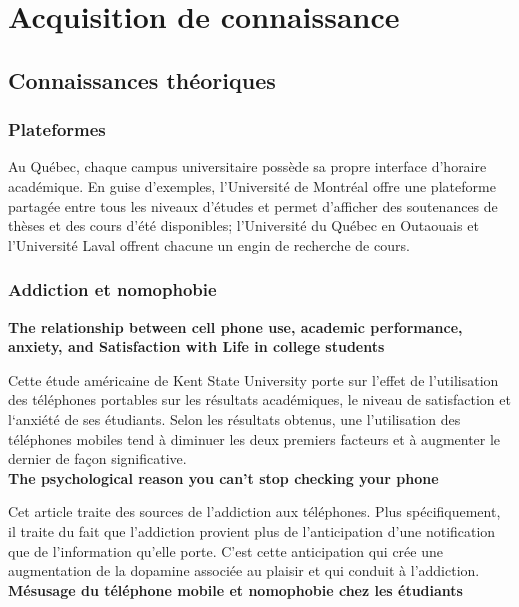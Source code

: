 \section{Acquisition de connaissance}

	\subsection{Connaissances théoriques}
		\subsubsection{Plateformes}
		Au Québec, chaque campus universitaire possède sa propre interface d'horaire académique. En guise d'exemples, l'Université de Montréal offre une plateforme partagée entre tous les niveaux d'études et permet d'afficher des soutenances de thèses et des cours d'été disponibles; l'Université du Québec en Outaouais et l'Université Laval offrent chacune un engin de recherche de cours.
		
		\subsubsection{Addiction et nomophobie}
		
		{\bfseries \cite{relationship} The relationship between cell phone use, academic performance, anxiety, and Satisfaction with Life in college students}	
		
		Cette étude américaine de Kent State University porte sur l'effet de l'utilisation des téléphones portables sur les résultats académiques, le niveau de satisfaction et l‘anxiété de ses étudiants. Selon les résultats obtenus, une l'utilisation des téléphones mobiles tend à diminuer les deux premiers facteurs et à augmenter le dernier de façon significative. \\
		
		{\bfseries \cite{cannotStop} The psychological reason you can't stop checking your phone}
		
		Cet article traite des sources de l'addiction aux téléphones. Plus spécifiquement, il traite du fait que l'addiction provient plus de l'anticipation d'une notification que de l'information qu'elle porte. C'est cette anticipation qui crée une augmentation de la dopamine associée au plaisir et qui conduit à l'addiction. \\
		
		{\bfseries \cite{mesusage} Mésusage du téléphone mobile et nomophobie chez les étudiants}
		
